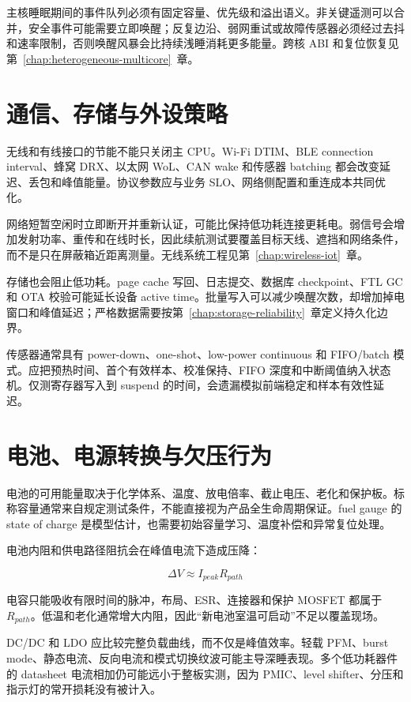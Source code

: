 主核睡眠期间的事件队列必须有固定容量、优先级和溢出语义。非关键遥测可以合并，安全事件可能需要立即唤醒；反复边沿、弱网重试或故障传感器必须经过去抖和速率限制，否则唤醒风暴会比持续浅睡消耗更多能量。跨核 ABI 和复位恢复见\mbox{第~\ref{chap:heterogeneous-multicore}~章}。

\section{通信、存储与外设策略}

无线和有线接口的节能不能只关闭主 CPU。Wi-Fi DTIM、BLE connection interval、蜂窝 DRX、以太网 WoL、CAN wake 和传感器 batching 都会改变延迟、丢包和峰值能量。协议参数应与业务 SLO、网络侧配置和重连成本共同优化。

网络短暂空闲时立即断开并重新认证，可能比保持低功耗连接更耗电。弱信号会增加发射功率、重传和在线时长，因此续航测试要覆盖目标天线、遮挡和网络条件，而不是只在屏蔽箱近距离测量。无线系统工程见\mbox{第~\ref{chap:wireless-iot}~章}。

存储也会阻止低功耗。page cache 写回、日志提交、数据库 checkpoint、FTL GC 和 OTA 校验可能延长设备 active time。批量写入可以减少唤醒次数，却增加掉电窗口和峰值延迟；严格数据需要按\mbox{第~\ref{chap:storage-reliability}~章}定义持久化边界。

传感器通常具有 power-down、one-shot、low-power continuous 和 FIFO/batch 模式。应把预热时间、首个有效样本、校准保持、FIFO 深度和中断阈值纳入状态机。仅测寄存器写入到 suspend 的时间，会遗漏模拟前端稳定和样本有效性延迟。

\section{电池、电源转换与欠压行为}

电池的可用能量取决于化学体系、温度、放电倍率、截止电压、老化和保护板。标称容量通常来自规定测试条件，不能直接视为产品全生命周期保证。fuel gauge 的 state of charge 是模型估计，也需要初始容量学习、温度补偿和异常复位处理。

电池内阻和供电路径阻抗会在峰值电流下造成压降：

\begin{equation}
  \Delta V\approx I_{peak}R_{path}
\end{equation}

电容只能吸收有限时间的脉冲，布局、ESR、连接器和保护 MOSFET 都属于 $R_{path}$。低温和老化通常增大内阻，因此“新电池室温可启动”不足以覆盖现场。

DC/DC 和 LDO 应比较完整负载曲线，而不仅是峰值效率。轻载 PFM、burst mode、静态电流、反向电流和模式切换纹波可能主导深睡表现。多个低功耗器件的 datasheet 电流相加仍可能远小于整板实测，因为 PMIC、level shifter、分压和指示灯的常开损耗没有被计入。

